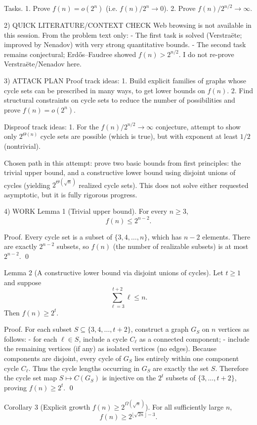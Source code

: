 Tasks.
1. Prove $f(n)=o(2^n)$ (i.e. $f(n)/2^n\to 0$).
2. Prove $f(n)/2^{n/2}\to\infty$.

2) QUICK LITERATURE/CONTEXT CHECK
Web browsing is not available in this session.
From the problem text only:
- The first task is solved (Verstra\"{e}te; improved by Nenadov) with very strong quantitative bounds.
- The second task remains conjectural; Erd\H{o}s--Faudree showed $f(n)>2^{n/2}$.
I do not re-prove Verstra\"{e}te/Nenadov here.

3) ATTACK PLAN
Proof track ideas:
1. Build explicit families of graphs whose cycle sets can be prescribed in many ways, to get lower bounds on $f(n)$.
2. Find structural constraints on cycle sets to reduce the number of possibilities and prove $f(n)=o(2^n)$.

Disproof track ideas:
1. For the $f(n)/2^{n/2}\to\infty$ conjecture, attempt to show only $2^{\Theta(n)}$ cycle sets are possible (which is true), but with exponent at least $1/2$ (nontrivial).

Chosen path in this attempt: prove two basic bounds from first principles: the trivial upper bound, and a constructive lower bound using disjoint unions of cycles (yielding $2^{\Theta(\sqrt n)}$ realized cycle sets). This does not solve either requested asymptotic, but it is fully rigorous progress.

4) WORK
Lemma 1 (Trivial upper bound).
For every $n\ge 3$,
\[f(n)\le 2^{n-2}.\]

Proof.
Every cycle set is a subset of $\{3,4,\dots,n\}$, which has $n-2$ elements.
There are exactly $2^{n-2}$ subsets, so $f(n)$ (the number of realizable subsets) is at most $2^{n-2}$. \qed

Lemma 2 (A constructive lower bound via disjoint unions of cycles).
Let $t\ge 1$ and suppose
\[\sum_{\ell=3}^{t+2} \ell \le n.\tag{*}\]
Then $f(n)\ge 2^{t}$.

Proof.
For each subset $S\subseteq \{3,4,\dots,t+2\}$, construct a graph $G_S$ on $n$ vertices as follows:
- for each $\ell\in S$, include a cycle $C_\ell$ as a connected component;
- include the remaining vertices (if any) as isolated vertices (no edges).
Because components are disjoint, every cycle of $G_S$ lies entirely within one component cycle $C_\ell$.
Thus the cycle lengths occurring in $G_S$ are exactly the set $S$.
Therefore the cycle set map $S\mapsto C(G_S)$ is injective on the $2^t$ subsets of $\{3,\dots,t+2\}$, proving $f(n)\ge 2^t$. \qed

Corollary 3 (Explicit growth $f(n)\ge 2^{\Omega(\sqrt n)}$).
For all sufficiently large $n$,
\[f(n)\ge 2^{\lfloor \sqrt{2n}\rfloor-3}.\]

